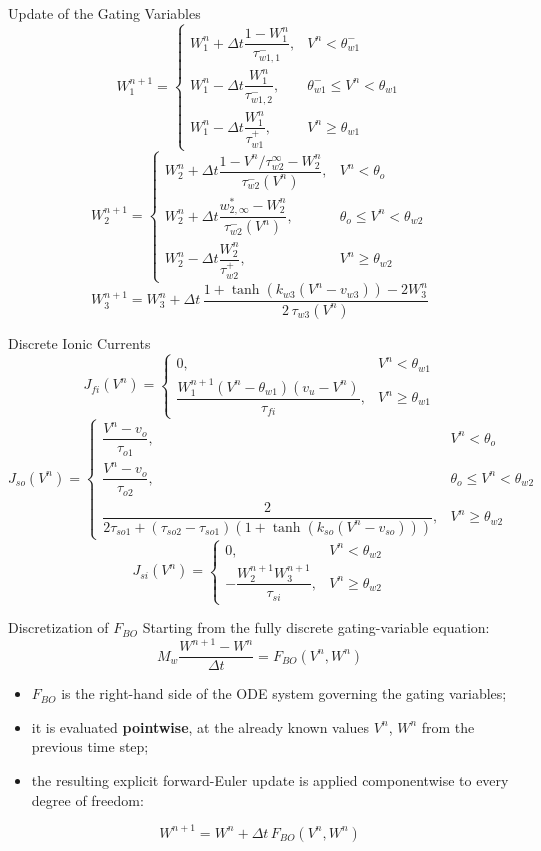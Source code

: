 \documentclass{beamer}
\begin{document}
\begin{frame}{Update of the Gating Variables}
\footnotesize
\[
W_1^{n+1} =
\begin{cases}
W_1^n + \Delta t\dfrac{1-W_1^n}{\tau^-_{w1,1}}, & V^n<\theta^-_{w1} \\[4pt]
W_1^n - \Delta t\dfrac{W_1^n}{\tau^-_{w1,2}}, & \theta^-_{w1}\le V^n<\theta_{w1} \\[4pt]
W_1^n - \Delta t\dfrac{W_1^n}{\tau^+_{w1}}, & V^n\ge\theta_{w1}
\end{cases}
\]
\[
W_2^{n+1} =
\begin{cases}
W_2^n + \Delta t\dfrac{1-V^n/\tau^\infty_{w2}-W_2^n}{\tau^-_{w2}(V^n)}, & V^n<\theta_o \\[4pt]
W_2^n + \Delta t\dfrac{w^*_{2,\infty}-W_2^n}{\tau^-_{w2}(V^n)}, & \theta_o\le V^n<\theta_{w2} \\[4pt]
W_2^n - \Delta t\dfrac{W_2^n}{\tau^+_{w2}}, & V^n\ge\theta_{w2}
\end{cases}
\]
\[
W_3^{n+1} = W_3^n + \Delta t\,\frac{1+\tanh(k_{w3}(V^n-v_{w3})) - 2W_3^n}{2\,\tau_{w3}(V^n)}
\]
\end{frame}

\begin{frame}{Discrete Ionic Currents}
\footnotesize
\[
J_{fi}(V^n) =
\begin{cases}
0, & V^n<\theta_{w1} \\
\dfrac{W_1^{n+1}(V^n-\theta_{w1})(v_u-V^n)}{\tau_{fi}}, & V^n\ge\theta_{w1}
\end{cases}
\]
\[
J_{so}(V^n) =
\begin{cases}
\dfrac{V^n-v_o}{\tau_{o1}}, & V^n<\theta_o \\[4pt]
\dfrac{V^n-v_o}{\tau_{o2}}, & \theta_o\le V^n<\theta_{w2} \\[4pt]
\dfrac{2}{2\tau_{so1}+(\tau_{so2}-\tau_{so1})\left(1+\tanh(k_{so}(V^n-v_{so}))\right)}, & V^n\ge\theta_{w2}
\end{cases}
\]
\[
J_{si}(V^n) =
\begin{cases}
0, & V^n<\theta_{w2} \\
-\dfrac{W_2^{n+1}W_3^{n+1}}{\tau_{si}}, & V^n\ge\theta_{w2}
\end{cases}
\]
\end{frame}


\begin{frame}{Discretization of $F_{BO}$}
Starting from the fully discrete gating-variable equation:
\[
M_w\frac{W^{n+1}-W^n}{\Delta t} = F_{BO}(V^n, W^n)
\]
\begin{itemize}
  \item $F_{BO}$ is the right-hand side of the ODE system governing the gating variables;
  \item it is evaluated \textbf{pointwise}, at the already known values
        $V^n$, $W^n$ from the previous time step;
  \item the resulting explicit forward-Euler update is applied
        componentwise to every degree of freedom:
\end{itemize}
\[
W^{n+1} = W^n + \Delta t\, F_{BO}(V^n, W^n)
\]
\end{frame}
\end{document}
